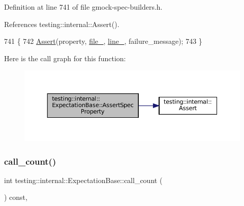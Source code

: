 Definition at line 741 of file gmock-\/spec-\/builders.\+h.



References testing\+::internal\+::\+Assert().


\begin{DoxyCode}
741                                                                               \{
742     \hyperlink{namespacetesting_1_1internal_a7a259643b7f2d23ce2b757728df42c99}{Assert}(property, \hyperlink{classtesting_1_1internal_1_1ExpectationBase_afabf690537298bbb84e9b443f62d7e97}{file\_}, \hyperlink{classtesting_1_1internal_1_1ExpectationBase_ab8143119e4b686ff1bb6c985924da57a}{line\_}, failure\_message);
743   \}
\end{DoxyCode}
Here is the call graph for this function\+:
\nopagebreak
\begin{figure}[H]
\begin{center}
\leavevmode
\includegraphics[width=350pt]{classtesting_1_1internal_1_1ExpectationBase_a2644117ae8b59bd19aa526549a11d84e_cgraph}
\end{center}
\end{figure}
\mbox{\label{classtesting_1_1internal_1_1ExpectationBase_aacc0399271907194ac1627439f65047a}} 
\subsubsection{\texorpdfstring{call\+\_\+count()}{call\_count()}}
{\footnotesize\ttfamily int testing\+::internal\+::\+Expectation\+Base\+::call\+\_\+count (\begin{DoxyParamCaption}{ }\end{DoxyParamCaption}) const\hspace{0.3cm}{\ttfamily [inline]}, {\ttfamily [protected]}}



